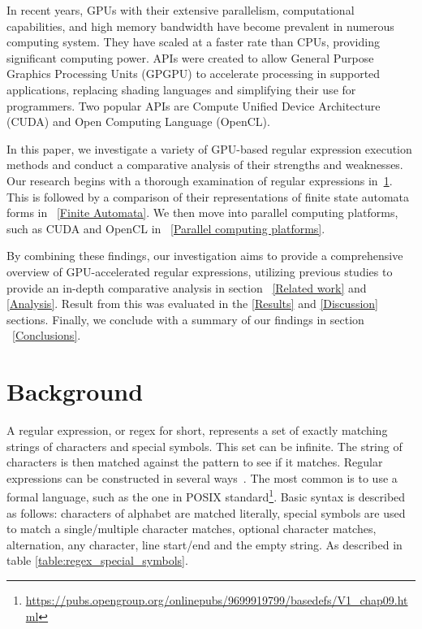 \documentclass[10pt,onecolumn,twoside,english,a4paper]{article}
\begin{document}
In recent years, GPUs with their extensive parallelism, computational capabilities, and high memory bandwidth have become prevalent in numerous computing system. They have scaled at a faster rate than CPUs, providing significant computing power\cite{sun2019summarizing,Liu:Asynchronous}. APIs were created to allow General Purpose Graphics Processing Units (GPGPU) to accelerate processing in supported applications, replacing shading languages and simplifying their use for programmers. Two popular APIs are Compute Unified Device Architecture (CUDA) and Open Computing Language (OpenCL)\cite{Fang:Comparison-cuda-opencl}.

In this paper, we investigate a variety of GPU-based regular expression execution methods and conduct a comparative analysis of their strengths and weaknesses. Our research begins with a thorough examination of regular expressions in~\ref{Background}. This is followed by a comparison of their representations of finite state automata forms in ~\ref{Finite Automata}. We then move into parallel computing platforms, such as CUDA and OpenCL in ~\ref{Parallel computing platforms}.

By combining these findings, our investigation aims to provide a comprehensive overview of GPU-accelerated regular expressions, utilizing previous studies to provide an in-depth comparative analysis in section ~\ref{Related work} and \ref{Analysis}. Result from this was evaluated in the \ref{Results} and \ref{Discussion} sections. Finally, we conclude with a summary of our findings in section ~\ref{Conclusions}.

\section{Background} \label{Background}
A regular expression, or regex for short, represents a set of exactly matching strings of characters and special symbols. This set can be infinite. The string of characters is then matched against the pattern to see if it matches. Regular expressions can be constructed in several ways~\cite{wang2014techniques}. The most common is to use a formal language, such as the one in POSIX standard\footnote{\url{https://pubs.opengroup.org/onlinepubs/9699919799/basedefs/V1_chap09.html}}.
Basic syntax is described as follows: characters of alphabet are matched literally, special symbols are used to match a single/multiple character matches, optional character matches, alternation, any character, line start/end and the empty string. As described in table \ref{table:regex_special_symbols}.
\end{document}
